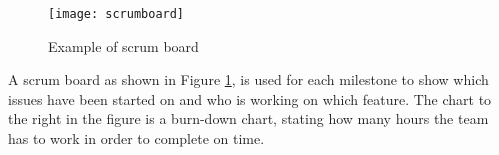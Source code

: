 \begin{figure}[!htpb]
\centering
	\texttt{[image: scrumboard]}
\caption{Example of scrum board \citep{scrumboard}}
\label{scrumboard}
\end{figure}

A scrum board as shown in Figure \ref{scrumboard}, is used for each milestone to show which issues have been started on and who is working on which feature. The chart to the right in the figure is a burn-down chart, stating how many hours the team has to work in order to complete on time.
